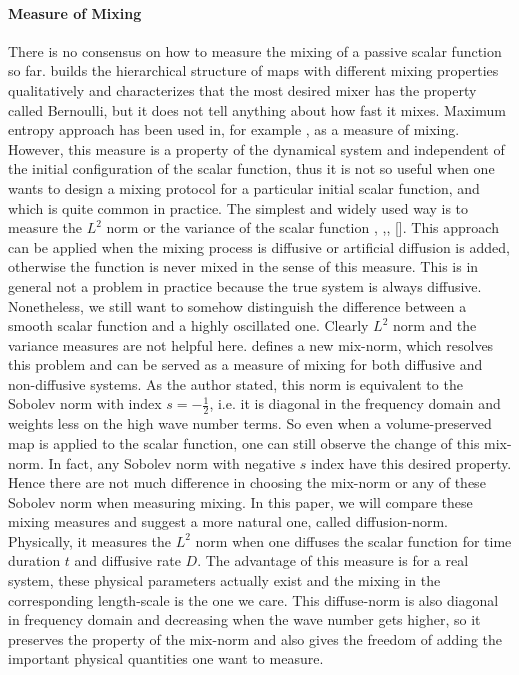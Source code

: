 \documentclass{article}
\begin{document}
\paragraph{Measure of Mixing}
There is no consensus on how to measure the mixing of a passive
scalar function so far\cite{Mezic2005}. \cite{Wiggins2004} builds
the hierarchical structure of maps with different mixing properties
qualitatively and characterizes that the most desired mixer has the
property called Bernoulli, but it does not tell anything about how
fast it mixes. Maximum entropy approach has been used in, for
example \cite{DAlessandro1999}, as a measure of mixing. However,
this measure is a property of the dynamical system and independent
of the initial configuration of the scalar function, thus it is not
so useful when one wants to design a mixing protocol for a
particular initial scalar function, and which is quite common in
practice. The simplest and widely used way is to measure the $L^2$
norm or the variance of the scalar function \cite{Ashwin2002},
\cite{Thiffeault2003-13},\cite{Thiffeault2003-309}, []. This
approach can be applied when the mixing process is diffusive or
artificial diffusion is added, otherwise the function is never mixed
in the sense of this measure. This is in general not a problem in
practice because the true system is always diffusive. Nonetheless,
we still want to somehow distinguish the difference between a smooth
scalar function and a highly oscillated one. Clearly $L^2$ norm and
the variance measures are not helpful here. \cite{Mezic2005} defines
a new mix-norm, which resolves this problem and can be served as a
measure of mixing for both diffusive and non-diffusive systems. As
the author stated, this norm is equivalent to the Sobolev norm with
index $s = -\frac{1}{2}$, i.e. it is diagonal in the frequency
domain and weights less on the high wave number terms. So even when
a volume-preserved map is applied to the scalar function, one can
still observe the change of this mix-norm. In fact, any Sobolev norm
with negative $s$ index have this desired property. Hence there are
not much difference in choosing the mix-norm or any of these Sobolev
norm when measuring mixing. In this paper, we will compare these
mixing measures and suggest a more natural one, called
diffusion-norm. Physically, it measures the $L^2$ norm when one
diffuses the scalar function for time duration $t$ and diffusive
rate $D$. The advantage of this measure is for a real system, these
physical parameters actually exist and the mixing in the
corresponding length-scale is the one we care. This diffuse-norm is
also diagonal in frequency domain and decreasing when the wave
number gets higher, so it preserves the property of the mix-norm and
also gives the freedom of adding the important physical quantities
one want to measure.
\end{document}
